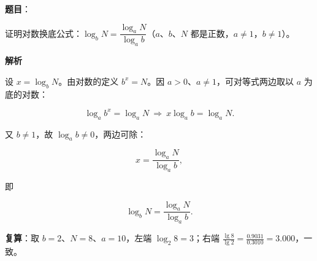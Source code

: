 \begin{answer}

\textbf{题目}：

证明对数换底公式：$\log_b N=\dfrac{\log_a N}{\log_a b}$（$a$、$b$、$N$ 都是正数，$a\neq1$，$b\neq1$）。

\textbf{解析}

设 $x=\log_b N$。由对数的定义 $b^x=N$。因 $a>0$、$a\neq1$，可对等式两边取以 $a$ 为底的对数：

\nopagebreak[4]
\[
\log_a b^x=\log_a N\ \Longrightarrow\ x\log_a b=\log_a N.
\]

又 $b\neq1$，故 $\log_a b\neq0$，两边可除：

\nopagebreak[4]
\[
x=\frac{\log_a N}{\log_a b},
\]

即

\nopagebreak[4]
\[
\log_b N=\frac{\log_a N}{\log_a b}.
\]

\textbf{复算}：取 $b=2$、$N=8$、$a=10$，左端 $\log_2 8=3$；右端 $\frac{\lg8}{\lg2}=\frac{0.9031}{0.3010}=3.000$，一致。


\end{answer}
